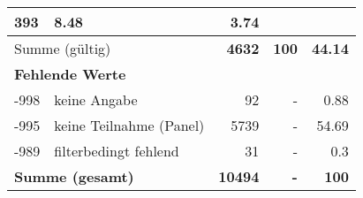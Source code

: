\begin{longtable}{lXrrr}
       \num{393} &
       \num[round-mode=places,round-precision=2]{8.48} &
         \num[round-mode=places,round-precision=2]{3.74} \\
     \midrule
     \multicolumn{2}{l}{Summe (gültig)} &
       \textbf{\num{4632}} &
     \textbf{\num{100}} &
       \textbf{\num[round-mode=places,round-precision=2]{44.14}} \\
     \multicolumn{5}{l}{\textbf{Fehlende Werte}}\\
       -998 &
       keine Angabe &
         \num{92} &
        - &
         \num[round-mode=places,round-precision=2]{0.88} \\
       -995 &
       keine Teilnahme (Panel) &
         \num{5739} &
        - &
         \num[round-mode=places,round-precision=2]{54.69} \\
       -989 &
       filterbedingt fehlend &
         \num{31} &
        - &
         \num[round-mode=places,round-precision=2]{0.3} \\
     \midrule
     \multicolumn{2}{l}{\textbf{Summe (gesamt)}} &
          \textbf{\num{10494}} &
        \textbf{-} &
        \textbf{\num{100}} \\
     \bottomrule
     \end{longtable}
     
